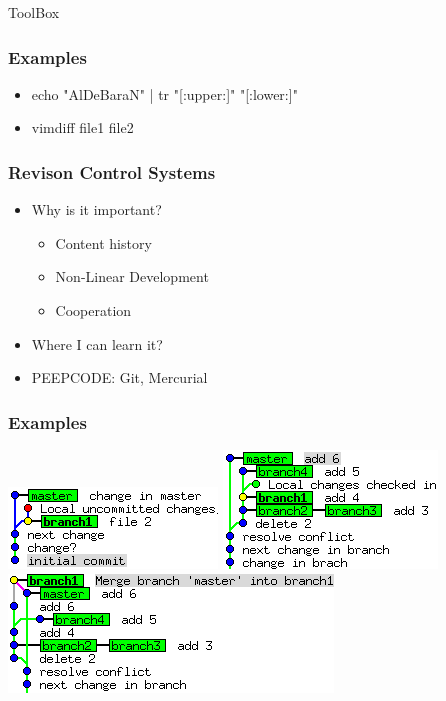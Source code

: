 \documentclass[fleqn]{beamer}
\begin{document}
\begin{section}{ToolBox}
\begin{frame}\frametitle{Examples}
  \begin{itemize}
    \item echo "AlDeBaraN" | tr "[:upper:]" "[:lower:]"
    \item vimdiff file1 file2
  \end{itemize}
  \end{frame}


  \begin{frame}\frametitle{Revison Control Systems}
  \begin{itemize}
    \item{Why is it important?}
      \begin{itemize}
      \item Content history
      \item Non-Linear Development
      \item Cooperation
      \end{itemize}
    \item{Where I can learn it?}
    \item PEEPCODE: Git, Mercurial
  \end{itemize}
  \end{frame}
\end{section}

\begin{frame}\frametitle{Examples}
      \includegraphics[scale = .5]{git1}    
      \includegraphics[scale = .5]{git2}    
      \includegraphics[scale = .5]{git4}    
\end{frame}
\end{document}
